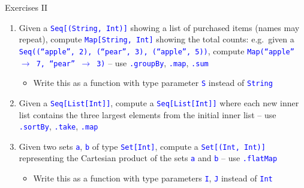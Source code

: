 \documentclass[english]{beamer}
\begin{document}
\begin{frame}{Exercises II}

\begin{enumerate}
\item Given a \texttt{\textcolor{blue}{\footnotesize{}Seq{[}(String, Int){]}}}
showing a list of purchased items (names may repeat), compute \texttt{\textcolor{blue}{\footnotesize{}Map{[}String,
Int{]}}} showing the total counts: e.g.~given a \texttt{\textcolor{blue}{\footnotesize{}Seq((``apple'',
2), (``pear'', 3), (``apple'', 5))}}, compute \texttt{\textcolor{blue}{\footnotesize{}Map(``apple''
$\rightarrow$ 7, ``pear'' $\rightarrow$ 3)}} -- use \texttt{\textcolor{blue}{\footnotesize{}.groupBy}},
\texttt{\textcolor{blue}{\footnotesize{}.map}}, \texttt{\textcolor{blue}{\footnotesize{}.sum}}{\footnotesize\par}
\begin{itemize}
\item Write this as a function with type parameter \texttt{\textcolor{blue}{\footnotesize{}S}}
instead of \texttt{\textcolor{blue}{\footnotesize{}String}}{\footnotesize\par}
\end{itemize}
\item Given a \texttt{\textcolor{blue}{\footnotesize{}Seq{[}List{[}Int{]}{]}}},
compute a \texttt{\textcolor{blue}{\footnotesize{}Seq{[}List{[}Int{]}{]}}}
where each new inner list contains the three largest elements from
the initial inner list -- use \texttt{\textcolor{blue}{\footnotesize{}.sortBy}},
\texttt{\textcolor{blue}{\footnotesize{}.take}}, \texttt{\textcolor{blue}{\footnotesize{}.map}}{\footnotesize\par}
\item Given two sets \texttt{\textcolor{blue}{\footnotesize{}a}}, \texttt{\textcolor{blue}{\footnotesize{}b}}
of type \texttt{\textcolor{blue}{\footnotesize{}Set{[}Int{]}}}, compute
a \texttt{\textcolor{blue}{\footnotesize{}Set{[}(Int, Int){]}}} representing
the Cartesian product of the sets \texttt{\textcolor{blue}{\footnotesize{}a}}
and \texttt{\textcolor{blue}{\footnotesize{}b}} -- use \texttt{\textcolor{blue}{\footnotesize{}.flatMap}}{\footnotesize\par}
\begin{itemize}
\item Write this as a function with type parameters \texttt{\textcolor{blue}{\footnotesize{}I}},
\texttt{\textcolor{blue}{\footnotesize{}J}} instead of \texttt{\textcolor{blue}{\footnotesize{}Int}}{\footnotesize\par}

\end{itemize}
\end{enumerate}
\end{frame}
\end{document}
